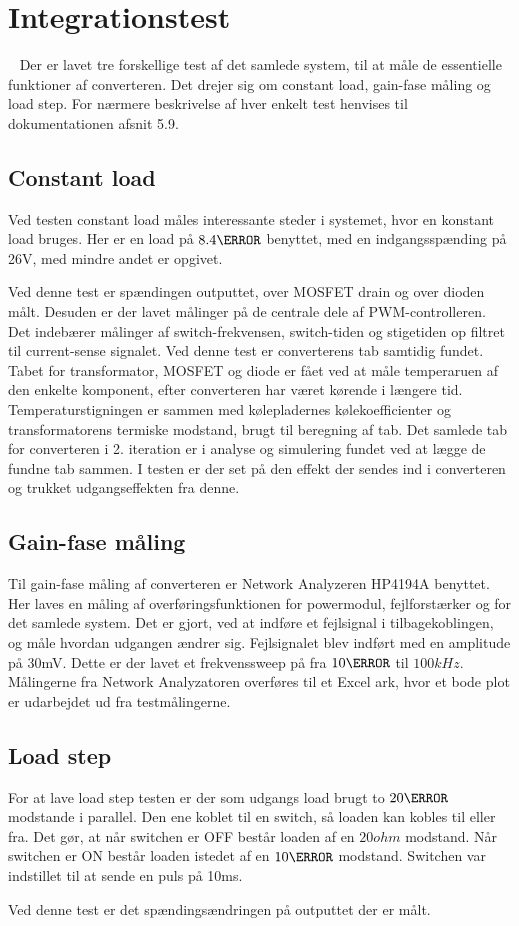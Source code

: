 \section{Integrationstest}~\label{Integrationstest}
Der er lavet tre forskellige test af det samlede system, til at måle de essentielle funktioner af converteren. Det drejer sig om constant load, gain-fase måling og load step. For nærmere beskrivelse af hver enkelt test henvises til dokumentationen afsnit 5.9.

\subsection{Constant load}
Ved testen constant load måles interessante steder i systemet, hvor en konstant load bruges. Her er en load på $8.4\ohm$ benyttet, med en indgangsspænding på 26V, med mindre andet er opgivet.

Ved denne test er spændingen outputtet, over MOSFET drain og over dioden målt. Desuden er der lavet målinger på de centrale dele af PWM-controlleren. Det indebærer målinger af switch-frekvensen, switch-tiden og stigetiden op filtret til current-sense signalet.  
Ved denne test er converterens tab samtidig fundet. Tabet for transformator, MOSFET og diode er fået ved at måle temperaruen af den enkelte komponent, efter converteren har været kørende i længere tid. Temperaturstigningen er sammen med kølepladernes kølekoefficienter og transformatorens termiske modstand, brugt til beregning af tab. Det samlede tab for converteren i 2. iteration er i analyse og simulering fundet ved at lægge de fundne tab sammen. I testen er der set på den effekt der sendes ind i converteren og trukket udgangseffekten fra denne.

\subsection{Gain-fase måling}
Til gain-fase måling af converteren er Network Analyzeren HP4194A benyttet. Her laves en måling af overføringsfunktionen for powermodul, fejlforstærker og for det samlede system. Det er gjort, ved at indføre et fejlsignal i tilbagekoblingen, og måle hvordan udgangen ændrer sig. Fejlsignalet blev indført med en amplitude på 30mV. Dette er der lavet et frekvenssweep på fra $10\Hz$ til $100kHz$. Målingerne fra Network Analyzatoren overføres til et Excel ark, hvor et bode plot er udarbejdet ud fra testmålingerne. 

\subsection{Load step}
For at lave load step testen er der som udgangs load brugt to $20\ohm$ modstande i parallel. Den ene koblet til en switch, så loaden kan kobles til eller fra. Det gør, at når switchen er OFF består loaden af en $20ohm$ modstand. Når switchen er ON består loaden istedet af en $10\ohm$ modstand. Switchen var indstillet til at sende en puls på 10ms.

Ved denne test er det spændingsændringen på outputtet der er målt.   